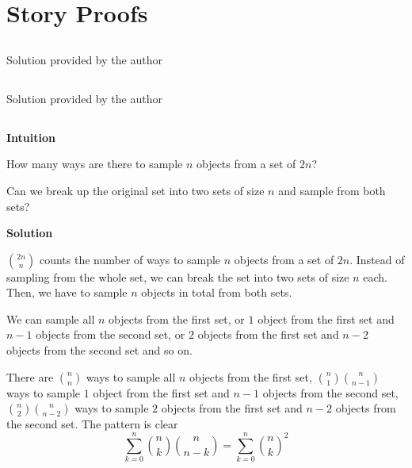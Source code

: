 \documentclass[]{book}
\begin{document}
\section{Story Proofs}\label{story-proofs}

\subsection{}\label{section-14}

Solution provided by the author

\subsection{}\label{section-15}

Solution provided by the author

\subsection{}\label{section-16}

\textbf{Intuition}

How many ways are there to sample \(n\) objects from a set of \(2n\)?

Can we break up the original set into two sets of size \(n\) and sample
from both sets?

 \textbf{Solution}

\({2n \choose n}\) counts the number of ways to sample \(n\) objects
from a set of \(2n\). Instead of sampling from the whole set, we can
break the set into two sets of size \(n\) each. Then, we have to sample
\(n\) objects in total from both sets.

We can sample all \(n\) objects from the first set, or \(1\) object from
the first set and \(n-1\) objects from the second set, or \(2\) objects
from the first set and \(n-2\) objects from the second set and so on.

There are \({n \choose n}\) ways to sample all \(n\) objects from the
first set, \({n \choose 1} {n \choose n-1}\) ways to sample \(1\) object
from the first set and \(n-1\) objects from the second set,
\({n \choose 2} {n \choose n-2}\) ways to sample \(2\) objects from the
first set and \(n-2\) objects from the second set. The pattern is clear
\[ \sum_{k=0}^{n} {n \choose k} {n \choose n-k} = \sum_{k=0}^{n} {n \choose k}^{2}\]

\subsection{}\label{section-17}
\end{document}
